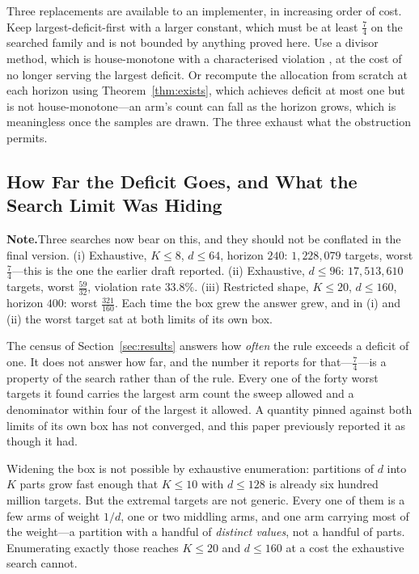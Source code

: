 \documentclass[conference]{IEEEtran}
\theoremstyle{definition}
\newif\ifshownotes\shownotestrue
\newcommand{\NOTEPAR}[1]{\ifshownotes\par\vspace{2pt}\noindent%
  {\color{notecol}\textsf{\footnotesize\textbf{Note.}\;#1}}\par\vspace{2pt}\fi}
\begin{document}
Three replacements are available to an implementer, in increasing order of cost. Keep
largest-deficit-first with a larger constant, which must be at least $\tfrac74$ on the searched
family and is not bounded by anything proved here. Use a divisor method, which is
house-monotone with a characterised violation \cite{balinski1982}, at the cost of no longer
serving the largest deficit. Or recompute the allocation from scratch at each horizon using
Theorem~\ref{thm:exists}, which achieves deficit at most one but is not house-monotone---an
arm's count can fall as the horizon grows, which is meaningless once the samples are drawn.
The three exhaust what the obstruction permits.

\subsection{How Far the Deficit Goes, and What the Search Limit Was Hiding}
\label{sec:frontier}
\NOTEPAR{Three searches now bear on this, and they should not be conflated in the final
version. (i) Exhaustive, $K\le8$, $d\le64$, horizon $240$: $1{,}228{,}079$ targets, worst
$\tfrac74$---this is the one the earlier draft reported. (ii) Exhaustive, $d\le96$:
$17{,}513{,}610$ targets, worst $\tfrac{59}{32}$, violation rate $33.8\%$. (iii) Restricted
shape, $K\le20$, $d\le160$, horizon $400$: worst $\tfrac{321}{160}$. Each time the box grew
the answer grew, and in (i) and (ii) the worst target sat at both limits of its own box.}

The census of Section~\ref{sec:results} answers how \emph{often} the rule exceeds a deficit of
one. It does not answer how far, and the number it reports for that---$\tfrac74$---is a
property of the search rather than of the rule. Every one of the forty worst targets it found
carries the largest arm count the sweep allowed and a denominator within four of the largest
it allowed. A quantity pinned against both limits of its own box has not converged, and this
paper previously reported it as though it had.

Widening the box is not possible by exhaustive enumeration: partitions of $d$ into $K$ parts
grow fast enough that $K\le10$ with $d\le128$ is already six hundred million targets. But the
extremal targets are not generic. Every one of them is a few arms of weight $1/d$, one or two
middling arms, and one arm carrying most of the weight---a partition with a handful of
\emph{distinct values}, not a handful of parts. Enumerating exactly those reaches
$K\le20$ and $d\le160$ at a cost the exhaustive search cannot.
\end{document}
